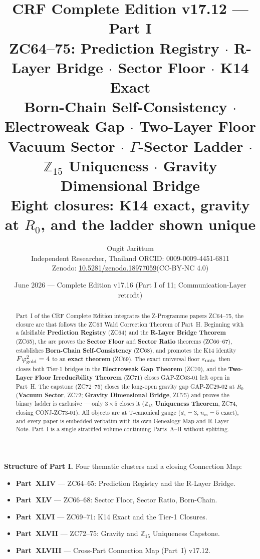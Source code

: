 \documentclass[12pt, a4paper]{article}
\title{%
  \textbf{\color{deepblue}CRF Complete Edition v17.12 --- Part I}\\[0.4em]
  \large ZC64--75: Prediction Registry $\cdot$ R-Layer Bridge $\cdot$
  Sector Floor $\cdot$ K14 Exact\\[0.2em]
  \normalsize\color{mutedgray}
  Born-Chain Self-Consistency $\cdot$ Electroweak Gap $\cdot$ Two-Layer Floor\\
  Vacuum Sector $\cdot$ $\Gamma$-Sector Ladder $\cdot$
  $\mathbb{Z}_{15}$ Uniqueness $\cdot$ Gravity Dimensional Bridge\\[0.2em]
  \textbf{\color{crfgreen}Eight closures: K14 exact, gravity at $R_0$,
  and the ladder shown unique}
}
\author{Ougit Jarittum\\
\small Independent Researcher, Thailand\quad
ORCID: 0009-0009-4451-6811\\
\small Zenodo: \href{https://doi.org/10.5281/zenodo.18977059}%
{10.5281/zenodo.18977059}\quad (CC-BY-NC 4.0)
}
\date{June 2026 --- Complete Edition v17.16 (Part I of 11; Communication-Layer retrofit)}
\begin{document}

\maketitle

\begin{abstract}
\noindent
Part~I of the CRF Complete Edition integrates the Z-Programme papers
ZC64--75, the closure arc that follows the ZC63 Wald Correction
Theorem of Part~H. Beginning with a falsifiable \textbf{Prediction
Registry} (ZC64) and the \textbf{R-Layer Bridge Theorem} (ZC65), the
arc proves the \textbf{Sector Floor} and \textbf{Sector Ratio}
theorems (ZC66--67), establishes \textbf{Born-Chain Self-Consistency}
(ZC68), and promotes the K14 identity $F\varphi_{\rm gold}^2=4$ to an
\textbf{exact theorem} (ZC69). The exact universal floor
$\varepsilon_{\rm univ}$ then closes both Tier-1 bridges in the
\textbf{Electroweak Gap Theorem} (ZC70), and the
\textbf{Two-Layer Floor Irreducibility Theorem} (ZC71) closes
GAP-ZC63-01 left open in Part~H. The capstone (ZC72--75) closes the
long-open gravity gap GAP-ZC29-02 at $R_0$ (\textbf{Vacuum Sector},
ZC72; \textbf{Gravity Dimensional Bridge}, ZC75) and proves the
binary ladder is exclusive --- only $3\times5$ closes it
(\textbf{$\mathbb{Z}_{15}$ Uniqueness Theorem}, ZC74, closing
CONJ-ZC73-01). All objects are at T-canonical gauge
($d_s=3$, $n_m=5$ exact), and every paper is embedded verbatim with
its own Genealogy Map and R-Layer Note. Part~I is a single
stratified volume continuing Parts~A--H without splitting.
\end{abstract}

\noindent
\textbf{Structure of Part I.} Four thematic clusters and a closing
Connection Map:
\begin{itemize}[leftmargin=1.5em]
\item \textbf{Part~XLIV} --- ZC64--65: Prediction Registry and the R-Layer Bridge.
\item \textbf{Part~XLV} --- ZC66--68: Sector Floor, Sector Ratio, Born-Chain.
\item \textbf{Part~XLVI} --- ZC69--71: K14 Exact and the Tier-1 Closures.
\item \textbf{Part~XLVII} --- ZC72--75: Gravity and $\mathbb{Z}_{15}$ Uniqueness Capstone.
\item \textbf{Part~XLVIII} --- Cross-Part Connection Map (Part~I) v17.12.
\end{itemize}
\end{document}
